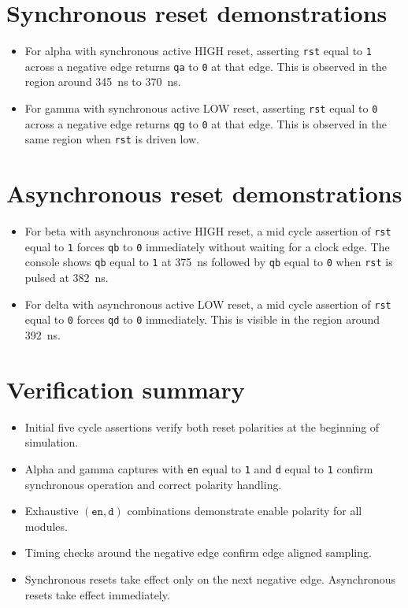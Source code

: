 \documentclass[11pt]{article}
\begin{document}
\section*{Synchronous reset demonstrations}
\begin{itemize}
  \item For alpha with synchronous active HIGH reset, asserting \texttt{rst} equal to \texttt{1} across a negative edge returns \texttt{qa} to \texttt{0} at that edge. This is observed in the region around \SI{345}{ns} to \SI{370}{ns}.
  \item For gamma with synchronous active LOW reset, asserting \texttt{rst} equal to \texttt{0} across a negative edge returns \texttt{qg} to \texttt{0} at that edge. This is observed in the same region when \texttt{rst} is driven low.
\end{itemize}

\section*{Asynchronous reset demonstrations}
\begin{itemize}
  \item For beta with asynchronous active HIGH reset, a mid cycle assertion of \texttt{rst} equal to \texttt{1} forces \texttt{qb} to \texttt{0} immediately without waiting for a clock edge. The console shows \texttt{qb} equal to \texttt{1} at \SI{375}{ns} followed by \texttt{qb} equal to \texttt{0} when \texttt{rst} is pulsed at \SI{382}{ns}.
  \item For delta with asynchronous active LOW reset, a mid cycle assertion of \texttt{rst} equal to \texttt{0} forces \texttt{qd} to \texttt{0} immediately. This is visible in the region around \SI{392}{ns}.
\end{itemize}

\section*{Verification summary}
\begin{itemize}
  \item Initial five cycle assertions verify both reset polarities at the beginning of simulation.
  \item Alpha and gamma captures with \texttt{en} equal to \texttt{1} and \texttt{d} equal to \texttt{1} confirm synchronous operation and correct polarity handling.
  \item Exhaustive \((\texttt{en},\texttt{d})\) combinations demonstrate enable polarity for all modules.
  \item Timing checks around the negative edge confirm edge aligned sampling.
  \item Synchronous resets take effect only on the next negative edge. Asynchronous resets take effect immediately.
\end{itemize}
\end{document}
